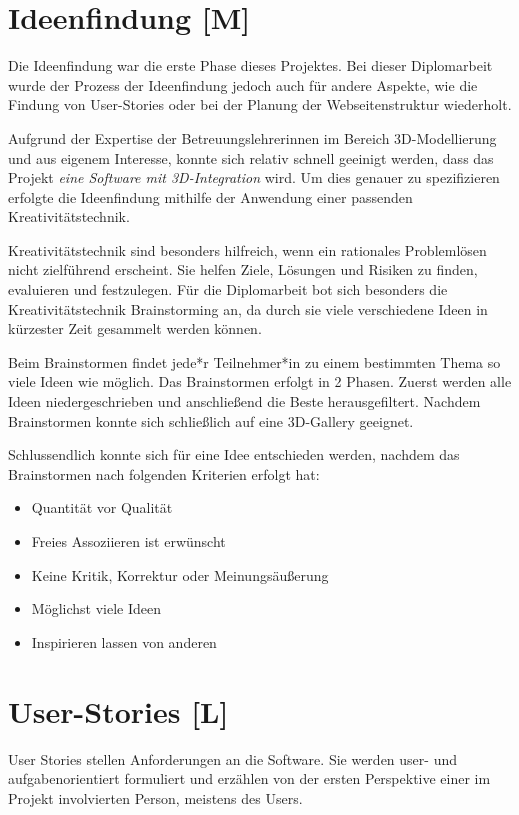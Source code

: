 
\section{Ideenfindung [M]}
Die Ideenfindung war die erste Phase dieses Projektes. Bei dieser Diplomarbeit wurde der Prozess der Ideenfindung jedoch auch für andere Aspekte, wie die Findung von User-Stories oder bei der Planung der Webseitenstruktur wiederholt.

Aufgrund der Expertise der Betreuungslehrerinnen im Bereich 
3D-Modellierung und aus eigenem Interesse, konnte sich relativ schnell geeinigt werden, dass das Projekt \emph{eine Software mit 3D-Integration} wird. Um dies genauer zu spezifizieren erfolgte die Ideenfindung mithilfe der Anwendung einer passenden Kreativitätstechnik.

Kreativitätstechnik sind besonders hilfreich, wenn ein rationales Problemlösen nicht zielführend erscheint. Sie helfen Ziele, Lösungen und Risiken zu finden, evaluieren und festzulegen. Für die Diplomarbeit bot sich besonders die Kreativitätstechnik Brainstorming an, da durch sie viele verschiedene Ideen in kürzester Zeit gesammelt werden können.

Beim Brainstormen findet jede*r Teilnehmer*in zu einem bestimmten Thema so viele Ideen wie möglich. Das Brainstormen erfolgt in 2 Phasen. Zuerst werden alle Ideen niedergeschrieben und anschließend die Beste herausgefiltert. Nachdem Brainstormen konnte sich schließlich auf eine 3D-Gallery geeignet. 

Schlussendlich konnte sich für eine Idee entschieden werden, nachdem das Brainstormen nach folgenden Kriterien erfolgt hat:
\begin{itemize}
    \item Quantität vor Qualität
    \item Freies Assoziieren ist erwünscht
    \item Keine Kritik, Korrektur oder Meinungsäußerung
    \item Möglichst viele Ideen
    \item Inspirieren lassen von anderen
\end{itemize}
\cite{Ideenfindung}



\section{User-Stories [L]}
\label{ch:user-stories}
User Stories stellen Anforderungen an die Software. Sie werden user- und aufgabenorientiert formuliert und erzählen von der ersten Perspektive einer im Projekt involvierten Person, meistens des Users. \cite{AgileVorgehensmodelle}
 
